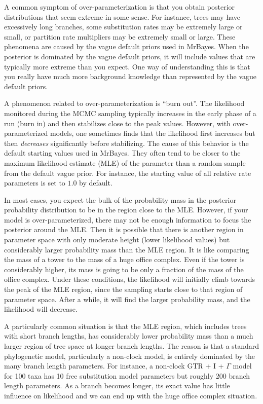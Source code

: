 \documentclass[12pt]{book}
\begin{document}
A common symptom of over-parameterization is that you obtain posterior distributions that seem
extreme in some sense. For instance, trees may have excessively long branches, some substitution
rates may be extremely large or small, or partition rate multipliers may be extremely small or
large.  These phenomena are caused by the vague default priors used in MrBayes. When the posterior
is dominated by the vague default priors, it will include values that are typically more extreme
than you expect. One way of understanding this is that you really have much more background
knowledge than represented by the vague default priors.

A phenomenon related to over-parameterization is ``burn out''. The likelihood monitored during the
MCMC sampling typically increases in the early phase of a run (burn in) and then stabilizes close
to the peak values. However, with over-parameterized models, one sometimes finds that the
likelihood first increases but then \emph{decreases} significantly before stabilizing.  The cause
of this behavior is the default starting values used in MrBayes. They often tend to be closer to
the maximum likelihood estimate (MLE) of the parameter than a random sample from the default vague
prior. For instance, the starting value of all relative rate parameters is set to $1.0$ by default.

In most cases, you expect the bulk of the probability mass in the posterior probability
distribution to be in the region close to the MLE. However, if your model is over-parameterized,
there may not be enough information to focus the posterior around the MLE. Then it is possible that
there is another region in parameter space with only moderate height (lower likelihood values) but
considerably larger probability mass than the MLE region. It is like comparing the mass of a tower
to the mass of a huge office complex. Even if the tower is considerably higher, its mass is going
to be only a fraction of the mass of the office complex. Under these conditions, the likelihood
will initially climb towards the peak of the MLE region, since the sampling starts close to that
region of parameter space. After a while, it will find the larger probability mass, and the
likelihood will decrease.

A particularly common situation is that the MLE region, which includes trees with short branch
lengths, has considerably lower probability mass than a much larger region of tree space at longer
branch lengths. The reason is that a standard phylogenetic model, particularly a non-clock model,
is entirely dominated by the many branch length parameters. For instance, a non-clock GTR + I +
$\Gamma$ model for 100 taxa has 10 free substitution model parameters but roughly 200 branch length
parameters. As a branch becomes longer, its exact value has little influence on likelihood and we
can end up with the huge office complex situation.
\end{document}

